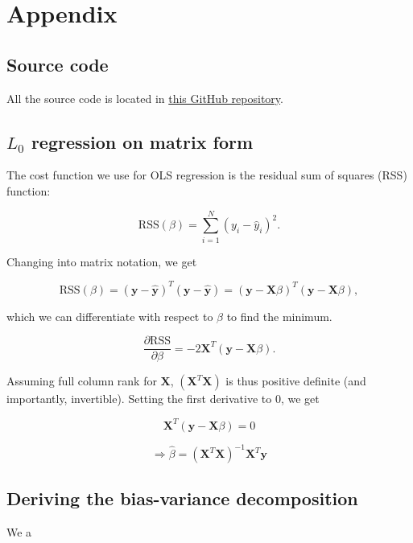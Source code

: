 \documentclass[../main.tex]{subfiles}
\begin{document}
\section{Appendix}
\subsection{Source code}
All the source code is located in \href{https://github.com/kmaasrud/reg-resample-fys-stk4155}{this GitHub repository}.

\subsection{$L_0$ regression on matrix form}
\label{sec:L0_matrix_form}
The cost function we use for OLS regression is the residual sum of squares (RSS) function:

\begin{equation*}
  \text{RSS}(\beta) = \sum_{i=1}^N \left(y_i - \hat y_i\right)^2 .
\end{equation*}

Changing into matrix notation, we get

\begin{equation*}
  \text{RSS}(\beta) = (\mathbf y - \hat{\mathbf y})^T(\mathbf y - \hat{\mathbf y}) = (\mathbf y  - \mathbf X\beta)^T(\mathbf y - \mathbf X\beta) ,
\end{equation*}

which we can differentiate with respect to $\beta$ to find the minimum.

\begin{equation*}
  \frac{\partial \text{RSS}}{\partial \beta} = -2\mathbf X^T (\mathbf y - \mathbf X\beta) .
\end{equation*}

Assuming full column rank for $\mathbf X$, $(\mathbf X^T \mathbf X)$ is thus positive definite (and importantly, invertible). Setting the first derivative to $0$, we get

\begin{equation*}
  \mathbf X^T(\mathbf y - \mathbf X\beta) = 0
\end{equation*}

\begin{equation*}
  \Rightarrow \hat \beta = (\mathbf X^T\mathbf X)^{-1}\mathbf X^T \mathbf y
\end{equation*}


\subsection{Deriving the bias-variance decomposition}\label{sec:bv_decomp}
We a
\end{document}
